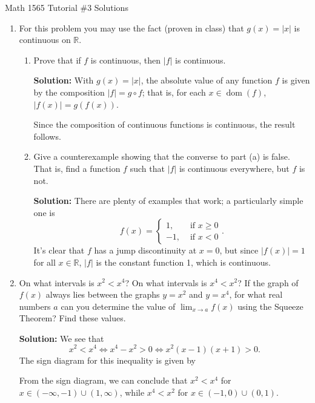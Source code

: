 \documentclass[12pt]{article}
\newcommand{\abs}[1]{\lvert #1\rvert}
\newcommand{\R}{\mathbb{R}}
\DeclareMathOperator{\dom}{dom}
\begin{document}
\begin{center}
Math 1565 Tutorial \#3 Solutions
\end{center}
\begin{enumerate}
 \item  For this problem you may use the fact (proven in class) that $g(x)=\abs{x}$ is continuous on $\R$.
 \begin{enumerate}
 \item Prove that if $f$ is continuous, then $\abs{f}$ is continuous.
 
 \medskip
 
\textbf{Solution:} With $g(x)=\abs{x}$, the absolute value of any function $f$ is given by the composition $\abs{f} = g\circ f$; that is, for each $x\in\dom(f)$, $\abs{f(x)} = g(f(x))$.

Since the composition of continuous functions is continuous, the result follows.

\medskip
 
 \item Give a counterexample showing that the converse to part (a) is false. That is, find a function $f$ such that $\abs{f}$ is continuous everywhere, but $f$ is not.

\medskip

\textbf{Solution:} There are plenty of examples that work; a particularly simple one is
\[
f(x) = \begin{cases}1, & \text{ if } x\geq 0\\-1, & \text{ if } x<0\end{cases}.
\]
It's clear that $f$ has a jump discontinuity at $x=0$, but since $\abs{f(x)} = 1$ for all $x\in \R$, $\abs{f}$ is the constant function 1, which is continuous.
 \end{enumerate}
 
\bigskip
 
 \item On what intervals is $x^2<x^4$? On what intervals is $x^4<x^2$? If the graph of $f(x)$ always lies between the graphs $y=x^2$ and $y=x^4$, for what real numbers $a$ can you determine the value of $\lim_{x\to a}f(x)$ using the Squeeze Theorem? Find these values.

\medskip

\textbf{Solution:} We see that
\[
x^2<x^4 \Leftrightarrow x^4-x^2>0 \Leftrightarrow x^2(x-1)(x+1)>0.
\]
The sign diagram for this inequality is given by
\begin{center}
\end{center}
From the sign diagram, we can conclude that $x^2<x^4$ for $x\in (-\infty, -1)\cup(1,\infty)$, while $x^4<x^2$ for $x\in (-1,0)\cup (0,1)$.


\end{enumerate}
\end{document}
